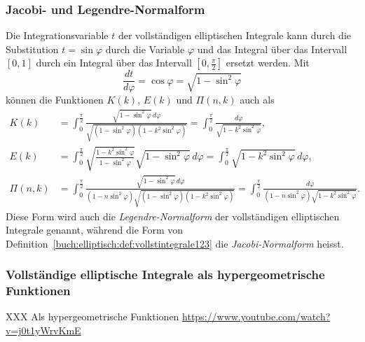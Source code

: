 \subsubsection{Jacobi- und Legendre-Normalform}
Die Integrationsvariable $t$ der vollständigen elliptischen Integrale
kann durch die Substitution $t=\sin\varphi$ durch die Variable
$\varphi$ und das Integral über das Intervall $[0,1]$ durch ein
Integral über das Intervall $[0,\frac{\pi}2]$ ersetzt werden.
Mit
\[
\frac{dt}{d\varphi} = \cos\varphi = \sqrt{1-\sin^2\varphi}
\]
können die Funktionen $K(k)$, $E(k)$ und $\Pi(n,k)$ auch als
\begin{align*}
K(k)
&=
\int_0^{\frac{\pi}2}
\frac{
\sqrt{1-\sin^2\varphi}\,d\varphi
}{
\sqrt{(1-\sin^2\varphi)(1-k^2\sin^2\varphi)}
}
=
\int_0^{\frac{\pi}2}
\frac{d\varphi}{\sqrt{1-k^2\sin^2\varphi}}
,
\\
E(k)
&=
\int_0^{\frac{\pi}2}
\sqrt{\frac{1-k^2\sin^2\varphi}{1-\sin^2\varphi}}\sqrt{1-\sin^2\varphi}\,d\varphi
=
\int_0^{\frac{\pi}2}
\sqrt{1-k^2\sin^2\varphi}\,d\varphi
,
\\
\Pi(n,k)
&=
\int_0^{\frac{\pi}2}
\frac{
\sqrt{1-\sin^2\varphi}\,d\varphi
}{
(1-n\sin^2\varphi)\sqrt{(1-\sin^2\varphi)(1-k^2\sin^2\varphi)}
}
=
\int_0^{\frac{\pi}2}
\frac{
d\varphi
}{
(1-n\sin^2\varphi)\sqrt{1-k^2\sin^2\varphi}
}
.
\end{align*}
Diese Form wird auch die {\em Legendre-Normalform} der vollständigen 
%
elliptischen Integrale genannt, während die Form von
Definition~\ref{buch:elliptisch:def:vollstintegrale123}
die {\em Jacobi-Normalform} heisst.
%

\subsubsection{Vollständige elliptische Integrale als hypergeometrische
Funktionen}
XXX Als hypergeometrische Funktionen \url{https://www.youtube.com/watch?v=j0t1yWrvKmE} \\




